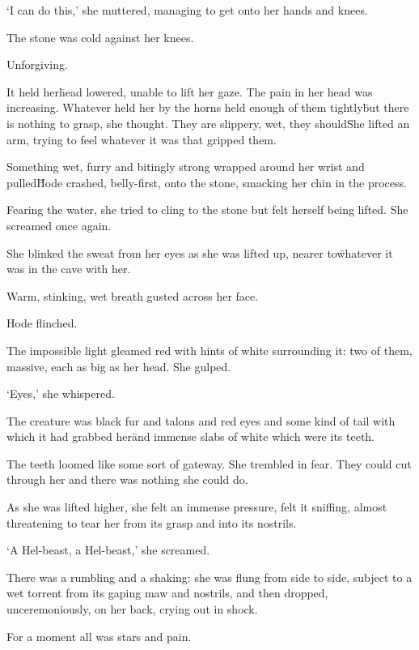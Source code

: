 `I can do this,' she muttered, managing to get onto her hands and knees.

The stone was cold against her 
knees.

Unforgiving.

It held her\=head lowered, unable to lift her gaze. The pain in her head was increasing. Whatever held 
her by the horns held enough of them tightly\=but there is nothing to grasp, she thought. They are 
slippery, wet, they should\=

She lifted an arm, trying to feel whatever it was that gripped them.

Something wet, furry and bitingly strong wrapped around her wrist and pulled\=Hode crashed, 
belly-first, onto the stone, smacking her chin in the process.

Fearing the water, she tried to cling to the stone but felt herself being lifted.
She screamed once again.

She blinked the sweat from her eyes as she was lifted up, nearer to\=whatever it was in the cave with her.

Warm, stinking, wet breath gusted across her face.

Hode flinched.


The impossible light gleamed red with hints of white surrounding it: two of them, massive, each as big as 
her head. She gulped.

`Eyes,' she whispered.

The creature was black fur and talons and red eyes and some kind of tail with which it had grabbed her\=and
immense slabs of white which were its teeth.

The teeth loomed like some sort of gateway. She trembled in fear. They could cut through her and there 
was nothing she could do.

As she was lifted higher, she felt an immense pressure, felt it sniffing, almost threatening to tear her from 
its grasp and into its nostrils.

`A Hel-beast, a Hel-beast,' she screamed.

There was a rumbling and a shaking: she was flung from side to side, subject to a wet torrent from its 
gaping maw and nostrils, and then dropped, unceremoniously, on her back, crying out in shock.

For a moment all was stars and pain.

